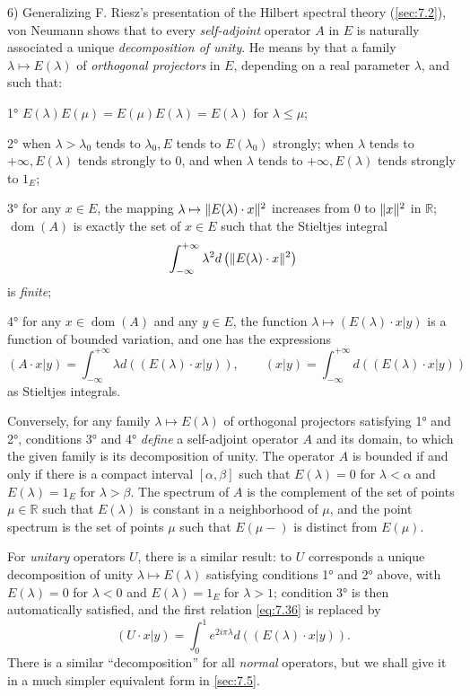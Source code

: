 \documentclass[12pt,a4paper,leqno,twoside]{extbook}
\DeclarePairedDelimiter{\norm}{\lVert}{\rVert}
\newcommand{\R}{\mathbb{R}}
\newcommand{\dom}{\operatorname{dom}}
\begin{document}
6) Generalizing F. Riesz's presentation of the Hilbert spectral theory (\ref{sec:7.2}), von Neumann shows that to every \emph{self-adjoint} operator \(A\) in \(E\) is naturally associated a unique \emph{decomposition of unity}. He means by that a family \(\lambda \mapsto E(\lambda)\) of \emph{orthogonal projectors} in \(E\), depending on a real parameter \(\lambda\), and such that:

1° \(E(\lambda) E(\mu) = E(\mu) E(\lambda) = E(\lambda)\) for \(\lambda \leq \mu\);

2° when \(\lambda > \lambda_0\) tends to \(\lambda_0, E\) tends to \(E(\lambda_0)\) strongly; when \(\lambda\) tends to \(+\infty, E(\lambda)\) tends strongly to \(0\), and when \(\lambda\) tends to \(+\infty, E(\lambda)\) tends strongly to \(1_E\);

3° for any \(x \in E\), the mapping \(\lambda \mapsto \norm{E(\lambda) \cdot x}^2\) increases from 0 to \(\norm{x}^2\) in \(\R\); \(\dom(A)\) is exactly the set of \(x \in E\) such that the Stieltjes integral
\[
    \int_{-\infty}^{+\infty} \lambda^2 d\left( \norm{E(\lambda) \cdot x}^2 \right)
\]
is \emph{finite};

4° for any \(x \in \dom(A)\) and any \(y \in E\), the function \(\lambda \mapsto (E(\lambda) \cdot x | y)\) is a function of bounded variation, and one has the expressions
\begin{equation}
    \label{eq:7.36}
    (A \cdot x | y) = \int_{-\infty}^{+\infty} \lambda d((E(\lambda) \cdot x | y)),
    \qquad
    (x|y) = \int_{-\infty}^{+\infty} d((E(\lambda) \cdot x | y))
\end{equation}
as Stieltjes integrals.

Conversely, for any family \(\lambda \mapsto E(\lambda)\) of orthogonal projectors satisfying 1° and 2°, conditions 3° and 4° \emph{define} a self-adjoint operator \(A\) and its domain, to which the given family is its decomposition of unity. The operator \(A\) is bounded if and only if there is a compact interval \([\alpha, \beta]\) such that \(E(\lambda) = 0\) for \(\lambda < \alpha\) and \(E(\lambda) = 1_E\) for \(\lambda > \beta\). The spectrum of \(A\) is the complement of the set of points \(\mu \in \R\) such that \(E(\lambda)\) is constant in a neighborhood of \(\mu\), and the point spectrum is the set of points \(\mu\) such that \(E(\mu-)\) is distinct from \(E(\mu)\).

For \emph{unitary} operators \(U\), there is a similar result: to \(U\) corresponds a unique decomposition of unity \(\lambda \mapsto E(\lambda)\) satisfying conditions 1° and 2° above, with \(E(\lambda) = 0\) for \(\lambda < 0\) and \(E(\lambda) = 1_E\) for \(\lambda  > 1\); condition 3° is then automatically satisfied, and the first relation \eqref{eq:7.36} is replaced by
\begin{equation}
    \label{eq:7.37}
    (U \cdot x | y) = \int_0^1 e^{2i \pi \lambda} d((E(\lambda) \cdot x | y)).
\end{equation}
There is a similar ``decomposition'' for all \emph{normal} operators, but we shall give it in a much simpler equivalent form in \ref{sec:7.5}.
\end{document}
